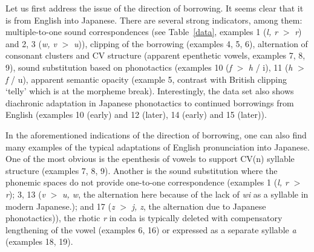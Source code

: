 \documentclass[12pt]{article}
\begin{document}
Let us first address the issue of the direction of borrowing. It seems clear that it is from English into Japanese. There are several strong indicators, among them: multiple-to-one sound correspondences (see Table~\ref{data}, examples 1 ({\it l, r} $>$ {\it r}) and 2, 3 ({\it w, v} $>$ {\it u})), clipping of the borrowing (examples 4, 5, 6), alternation of consonant clusters and CV structure (apparent epenthetic vowels, examples 7, 8, 9), sound substitution based on phonotactics (examples 10 ({\it f} $>$ {\it h} / \und i), 11 ({\it h} $>$ {\it f} / \und u), apparent semantic opacity (example 5, contrast with British clipping `telly' which is at the morpheme break). Interestingly, the data set also shows diachronic adaptation in Japanese phonotactics to continued borrowings from English (examples 10 (early) and 12 (later), 14 (early) and 15 (later)).

In the aforementioned indications of the direction of borrowing, one can also find many examples of the typical adaptations of English pronunciation into Japanese. One of the most obvious is the epenthesis of vowels to support CV(n) syllable structure (examples 7, 8, 9). Another is the sound substitution where the phonemic spaces do not provide one-to-one correspondence (examples 1 ({\it l, r} $>$ {\it r}); 3, 13 ({\it v} $>$ {\it u, w}, the alternation here because of the lack of {\it wi} as a syllable in modern Japanese.); and 17 ({\it z} $>$ {\it j, z}, the alternation due to Japanese phonotactics)), the rhotic {\it r} in coda is typically deleted with compensatory lengthening of the vowel (examples 6, 16) or expressed as a separate syllable {\it a} (examples 18, 19).
\end{document}
